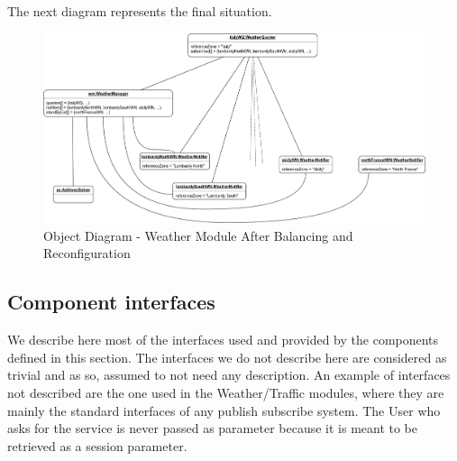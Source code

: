 		The next diagram represents the final situation.
		\begin{figure}[H]
			\centerline{\includegraphics[width=0.9\paperwidth]{Images/OD_WeatherModule_After}}
			\caption{Object Diagram - Weather Module After Balancing and Reconfiguration}
		\end{figure}
\subsection{Component interfaces}
	We describe here most of the interfaces used and provided by the components defined in this section. The interfaces we do not describe here are considered as trivial and as so, assumed to not need any description. An example of interfaces not described are the one used in the Weather/Traffic modules, where they are mainly the standard interfaces of any publish subscribe system.
	\newline
	The User who asks for the service is never passed as parameter because it is meant to be retrieved as a session parameter.
	
